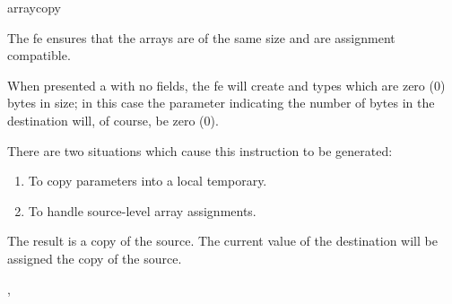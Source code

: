 \begin{instruction}{arraycopy}\label{memory:arraycopy}

  \begin{notes}
    The \ac{fe} ensures that the arrays are of the same size and are
    assignment compatible.

    When presented a  with no fields, the \ac{fe} will
    create  and  types which are zero (0)
    bytes in size; in this case the parameter indicating the number of
    bytes in the destination will, of course, be zero (0).

    There are two situations which cause this instruction to be
    generated:
    \begin{enumerate}
    \item To copy \byval parameters into a local temporary.
    \item To handle source-level array assignments.
    \end{enumerate}
  \end{notes}

  \begin{results}
  \item The result is a copy of the source.  The current value of the
    destination will be assigned the copy of the source.
  \end{results}

  \begin{operands}
  \item {}
  \item {}
  \item {}
  \item {}
  \item {}
  \end{operands}

  \begin{seealso}
    , 
  \end{seealso}
\end{instruction}

